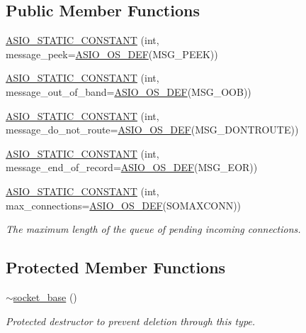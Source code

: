 \subsection*{Public Member Functions}
\begin{DoxyCompactItemize}
\item 
\hyperlink{classasio_1_1socket__base_a22a2b836c3cd24eacb58c46c6e2524dc}{A\+S\+I\+O\+\_\+\+S\+T\+A\+T\+I\+C\+\_\+\+C\+O\+N\+S\+T\+A\+N\+T} (int, message\+\_\+peek=\hyperlink{socket__types_8hpp_a26e0208fa086ac48cf5af1b2a521c74a}{A\+S\+I\+O\+\_\+\+O\+S\+\_\+\+D\+E\+F}(M\+S\+G\+\_\+\+P\+E\+E\+K))
\item 
\hyperlink{classasio_1_1socket__base_ac7943cf04e37e42fffc501b8f5bcf473}{A\+S\+I\+O\+\_\+\+S\+T\+A\+T\+I\+C\+\_\+\+C\+O\+N\+S\+T\+A\+N\+T} (int, message\+\_\+out\+\_\+of\+\_\+band=\hyperlink{socket__types_8hpp_a26e0208fa086ac48cf5af1b2a521c74a}{A\+S\+I\+O\+\_\+\+O\+S\+\_\+\+D\+E\+F}(M\+S\+G\+\_\+\+O\+O\+B))
\item 
\hyperlink{classasio_1_1socket__base_a6fa891138f1218c50aa4f879861574fd}{A\+S\+I\+O\+\_\+\+S\+T\+A\+T\+I\+C\+\_\+\+C\+O\+N\+S\+T\+A\+N\+T} (int, message\+\_\+do\+\_\+not\+\_\+route=\hyperlink{socket__types_8hpp_a26e0208fa086ac48cf5af1b2a521c74a}{A\+S\+I\+O\+\_\+\+O\+S\+\_\+\+D\+E\+F}(M\+S\+G\+\_\+\+D\+O\+N\+T\+R\+O\+U\+T\+E))
\item 
\hyperlink{classasio_1_1socket__base_a0d8414096718a77c1e5cad2d75d0e07f}{A\+S\+I\+O\+\_\+\+S\+T\+A\+T\+I\+C\+\_\+\+C\+O\+N\+S\+T\+A\+N\+T} (int, message\+\_\+end\+\_\+of\+\_\+record=\hyperlink{socket__types_8hpp_a26e0208fa086ac48cf5af1b2a521c74a}{A\+S\+I\+O\+\_\+\+O\+S\+\_\+\+D\+E\+F}(M\+S\+G\+\_\+\+E\+O\+R))
\item 
\hyperlink{classasio_1_1socket__base_a774d6c355ca125c3ba3f8c268ab5dede}{A\+S\+I\+O\+\_\+\+S\+T\+A\+T\+I\+C\+\_\+\+C\+O\+N\+S\+T\+A\+N\+T} (int, max\+\_\+connections=\hyperlink{socket__types_8hpp_a26e0208fa086ac48cf5af1b2a521c74a}{A\+S\+I\+O\+\_\+\+O\+S\+\_\+\+D\+E\+F}(S\+O\+M\+A\+X\+C\+O\+N\+N))
\begin{DoxyCompactList}\small\item\em The maximum length of the queue of pending incoming connections. \end{DoxyCompactList}\end{DoxyCompactItemize}
\subsection*{Protected Member Functions}
\begin{DoxyCompactItemize}
\item 
\hyperlink{classasio_1_1socket__base_ad581462742d6f53451251c97610c57c9}{$\sim$socket\+\_\+base} ()
\begin{DoxyCompactList}\small\item\em Protected destructor to prevent deletion through this type. \end{DoxyCompactList}\end{DoxyCompactItemize}


